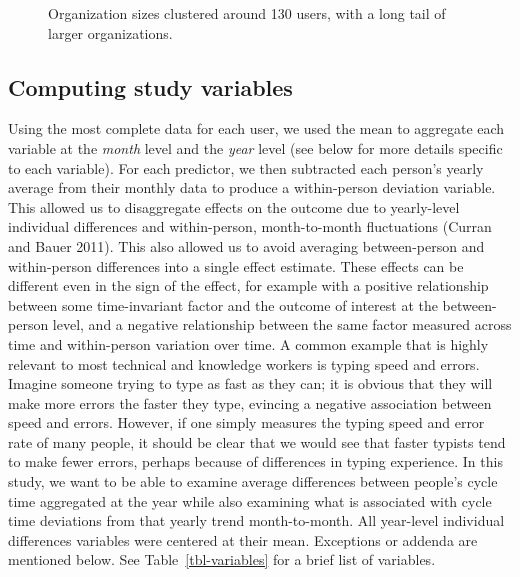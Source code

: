 \documentclass[
]{article}
\begin{document}
\begin{figure}[htbp]


\caption[Histogram of organization sizes in the
dataset.]{\label{fig-org-size}Organization sizes clustered around 130
users, with a long tail of larger organizations.}

\end{figure}%

\subsection{Computing study variables}\label{computing-study-variables}

Using the most complete data for each user, we used the mean to
aggregate each variable at the \emph{month} level and the \emph{year}
level (see below for more details specific to each variable). For each
predictor, we then subtracted each person's yearly average from their
monthly data to produce a within-person deviation variable. This allowed
us to disaggregate effects on the outcome due to yearly-level individual
differences and within-person, month-to-month fluctuations (Curran and
Bauer 2011). This also allowed us to avoid averaging between-person and
within-person differences into a single effect estimate. These effects
can be different even in the sign of the effect, for example with a
positive relationship between some time-invariant factor and the outcome
of interest at the between-person level, and a negative relationship
between the same factor measured across time and within-person variation
over time. A common example that is highly relevant to most technical
and knowledge workers is typing speed and errors. Imagine someone trying
to type as fast as they can; it is obvious that they will make more
errors the faster they type, evincing a negative association between
speed and errors. However, if one simply measures the typing speed and
error rate of many people, it should be clear that we would see that
faster typists tend to make fewer errors, perhaps because of differences
in typing experience. In this study, we want to be able to examine
average differences between people's cycle time aggregated at the year
while also examining what is associated with cycle time deviations from
that yearly trend month-to-month. All year-level individual differences
variables were centered at their mean. Exceptions or addenda are
mentioned below. See Table~\ref{tbl-variables} for a brief list of
variables.
\end{document}
